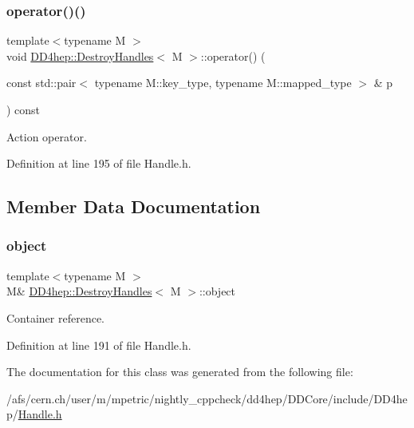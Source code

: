\subsubsection{\texorpdfstring{operator()()}{operator()()}}
{\footnotesize\ttfamily template$<$typename M $>$ \\
void \hyperlink{class_d_d4hep_1_1_destroy_handles}{D\+D4hep\+::\+Destroy\+Handles}$<$ M $>$\+::operator() (\begin{DoxyParamCaption}\item[{const std\+::pair$<$ typename M\+::key\+\_\+type, typename M\+::mapped\+\_\+type $>$ \&}]{p }\end{DoxyParamCaption}) const\hspace{0.3cm}{\ttfamily [inline]}}



Action operator. 



Definition at line 195 of file Handle.\+h.



\subsection{Member Data Documentation}
\hypertarget{class_d_d4hep_1_1_destroy_handles_a4398c11430a5bb66b962d45133e2d5f1}{}\label{class_d_d4hep_1_1_destroy_handles_a4398c11430a5bb66b962d45133e2d5f1} 
\subsubsection{\texorpdfstring{object}{object}}
{\footnotesize\ttfamily template$<$typename M $>$ \\
M\& \hyperlink{class_d_d4hep_1_1_destroy_handles}{D\+D4hep\+::\+Destroy\+Handles}$<$ M $>$\+::object}



Container reference. 



Definition at line 191 of file Handle.\+h.



The documentation for this class was generated from the following file\+:\begin{DoxyCompactItemize}
\item 
/afs/cern.\+ch/user/m/mpetric/nightly\+\_\+cppcheck/dd4hep/\+D\+D\+Core/include/\+D\+D4hep/\hyperlink{_handle_8h}{Handle.\+h}\end{DoxyCompactItemize}
